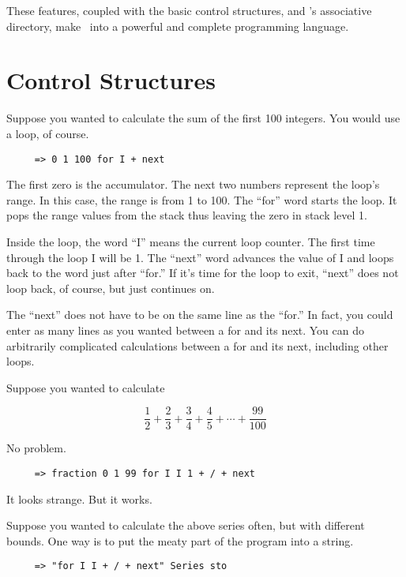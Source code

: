 These features, coupled with the basic control structures, and \CLAC's associative directory,
make \CLAC\ into a powerful and complete programming language.

\section{Control Structures}

Suppose you wanted to calculate the sum of the first 100 integers. You would use a loop, of
course.

\begin{verbatim}
     => 0 1 100 for I + next
\end{verbatim}

The first zero is the accumulator. The next two numbers represent the loop's range. In this
case, the range is from 1 to 100. The ``for'' word starts the loop. It pops the range values
from the stack thus leaving the zero in stack level 1.

Inside the loop, the word ``I'' means the current loop counter. The first time through the loop
I will be 1. The ``next'' word advances the value of I and loops back to the word just after
``for.'' If it's time for the loop to exit, ``next'' does not loop back, of course, but just
continues on.

The ``next'' does not have to be on the same line as the ``for.'' In fact, you could enter as
many lines as you wanted between a for and its next. You can do arbitrarily complicated
calculations between a for and its next, including other loops.

Suppose you wanted to calculate

\begin{displaymath}
     \frac{1}{2} + \frac{2}{3} + \frac{3}{4} + \frac{4}{5} + \cdots + \frac{99}{100}
\end{displaymath}

No problem.

\begin{verbatim}
     => fraction 0 1 99 for I I 1 + / + next
\end{verbatim}

It looks strange. But it works.

Suppose you wanted to calculate the above series often, but with different bounds. One way is to
put the meaty part of the program into a string.

\begin{verbatim}
     => "for I I + / + next" Series sto
\end{verbatim}

